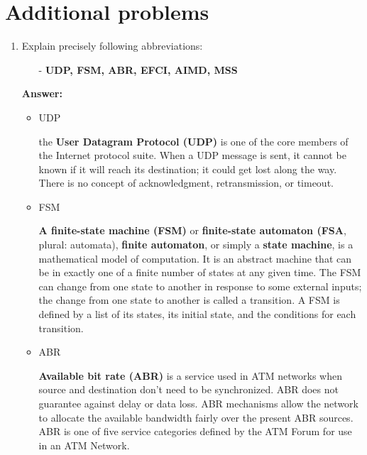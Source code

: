 
\section{Additional problems}

\begin{enumerate}
    \item Explain precisely following abbreviations:
    \begin{itemize}
        \item[-] \textbf{UDP, FSM, ABR, EFCI, AIMD, MSS}
    \end{itemize}
    
    \textbf{Answer:}
    
    \begin{itemize}
        \item UDP
        
        the \textbf{User Datagram Protocol (UDP)} is one of the core members of the Internet protocol suite. When a UDP message is sent, it cannot be known if it will reach its destination; it could get lost along the way. There is no concept of acknowledgment, retransmission, or timeout.
        
        \item FSM
        
        \textbf{A finite-state machine (FSM)} or \textbf{finite-state automaton (FSA}, plural: automata), \textbf{finite automaton}, or simply a \textbf{state machine}, is a mathematical model of computation. It is an abstract machine that can be in exactly one of a finite number of states at any given time. The FSM can change from one state to another in response to some external inputs; the change from one state to another is called a transition. A FSM is defined by a list of its states, its initial state, and the conditions for each transition.
        
        \item ABR
        
        \textbf{Available bit rate (ABR)} is a service used in ATM networks when source and destination don't need to be synchronized. ABR does not guarantee against delay or data loss. ABR mechanisms allow the network to allocate the available bandwidth fairly over the present ABR sources. ABR is one of five service categories defined by the ATM Forum for use in an ATM Network.
        

\end{itemize}
\end{enumerate}
